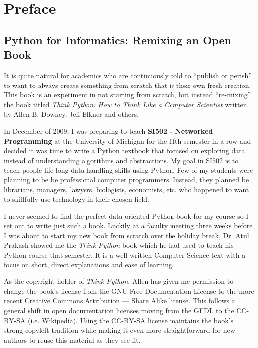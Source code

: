 \documentclass[10pt]{book}
\begin{document}
\chapter{Preface}

\section*{Python for Informatics: Remixing an Open Book}

It is quite natural for academics who are continuously told to 
``publish or perish'' to want to always create something from scratch
that is their own fresh creation.   This book is an 
experiment in not starting from scratch, but instead ``re-mixing''
the book titled
{\em Think Python: How to Think Like
a Computer Scientist}
written by Allen B. Downey, Jeff Elkner and others.

In December of 2009, I was preparing to teach
{\bf SI502 - Networked Programming} at the University of Michigan
for the fifth semester in a row and decided it was time
to write a Python textbook that focused on exploring data
instead of understanding algorithms and abstractions.
My goal in SI502 is to teach people life-long data handling 
skills using Python.  Few of my
students were planning to be be professional 
computer programmers.  Instead, they
planned be librarians, managers, lawyers, biologists, economists, etc. 
who happened to want to skillfully use technology in their chosen field.

I never seemed to find the perfect data-oriented Python
book for my course so I set out 
to write just such a book.  Luckily at a faculty meeting three weeks
before I was about to start my new book from scratch over 
the holiday break, 
Dr. Atul Prakash showed me the {\em Think Python} book which he had
used to teach his Python course that semester.  
It is a well-written Computer Science text with a focus on 
short, direct explanations and ease of learning.  


As the copyright holder of {\em Think Python},
Allen has given me permission to change the book's license 
from the
GNU Free Documentation License 
to the more recent
Creative Commons Attribution --- Share Alike
license.
This follows a general shift in open documentation licenses moving 
from the GFDL to the CC-BY-SA (i.e. Wikipedia).
Using the CC-BY-SA license maintains the book's 
strong copyleft tradition while making it even more straightforward 
for new authors to reuse this material as they see fit.
\end{document}
